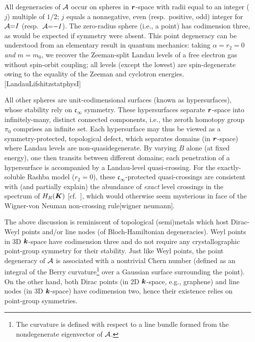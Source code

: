 \documentclass[aps, prb, showpacs, twocolumn, notitlepage, superscriptaddress]{revtex4-1}
\begin{document}

All degeneracies of ${\cal A}$ occur on spheres in $\boldsymbol{r}$-space with radii equal to an integer ($j$)  multiple of $1/2$;  ${j}$ equals a nonnegative, even (resp.\ positive, odd) integer for  ${\cal A}{=}I$ (resp.\ ${\cal A}{=}{-}I$).  The zero-radius sphere (i.e., a point) has codimension three, as would be expected if symmetry were absent.    
This point degeneracy can be understood from an elementary result in quantum mechanics: taking $\alpha{=}r_2{=}0$ \textit{and} $m{=}m_0$, we recover the Zeeman-split Landau levels of a free electron gas without spin-orbit coupling; all levels (except the lowest) are spin-degenerate owing to the equality of the Zeeman and cyclotron energies.[LandauLifshitzstatphysI]  

All other spheres are unit-codimensional surfaces (known as hypersurfaces), whose stability rely on $\mathfrak{c}_{\infty}$ symmetry. These hypersurfaces separate $\boldsymbol{r}$-space into infinitely-many, distinct connected components, i.e., the zeroth homotopy group $\pi_0$ comprises an infinite set. Each hypersurface may thus be viewed as a symmetry-protected, topological defect, which separates domains (in $\boldsymbol{r}$-space) where Landau levels are non-quasidegenerate. By varying $B$ alone (at fixed energy), one then transits between different domains; each penetration of a hypersurface is accompanied by a Landau-level quasi-crossing. For the exactly-soluble Rashba model ($r_2{=}0$), these $\mathfrak{c}_{\infty}$-protected quasi-crossings  are consistent with (and partially explain)  the abundance of \textit{exact} level crossings in the spectrum of $H_R(\boldsymbol{K})$ [cf.\ ], which would otherwise seem mysterious in face of  the Wigner-von Neuman non-crossing rule[wigner neumann].




The above discussion is reminiscent of topological (semi)metals which host Dirac-Weyl points and/or line nodes (of Bloch-Hamiltonian degeneracies). Weyl points in 3D $\boldsymbol{k}$-space have codimension three and do not require any crystallographic point-group symmetry for their stability. Just like Weyl points, the point degeneracy of ${\cal A}$ is associated with a nontrivial Chern number (defined as an integral of the Berry curvature\footnote{The curvature is defined with respect to a line bundle formed from the nondegenerate eigenvector of ${\cal A}$.} over a Gaussian surface surrounding the point). On the other hand,  both Dirac points (in 2D $\boldsymbol{k}$-space, e.g., graphene) and  line nodes (in 3D $\boldsymbol{k}$-space) have codimension two, hence their existence relies on point-group symmetries.  
\end{document}
